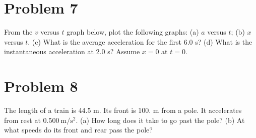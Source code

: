 \documentclass{article}
\begin{document}
\section*{Problem 7}
From the $v$ versus $t$ graph below, plot the following graphs: (a) $a$ versus $t$; (b) $x$ versus $t$.
(c) What is the average acceleration for the first 6.0 s? (d) What is the instantaneous
acceleration at 2.0 s? Assume $x = 0$ at $t = 0$.

\section*{Problem 8}
The length of a train is 44.5 m. Its front is 100. m from a pole. It accelerates from rest at
$0.500\ \unit{\meter\per\second^2}$. (a) How long does it take to go past the pole? (b) At what speeds do its front and
rear pass the pole?
\end{document}
